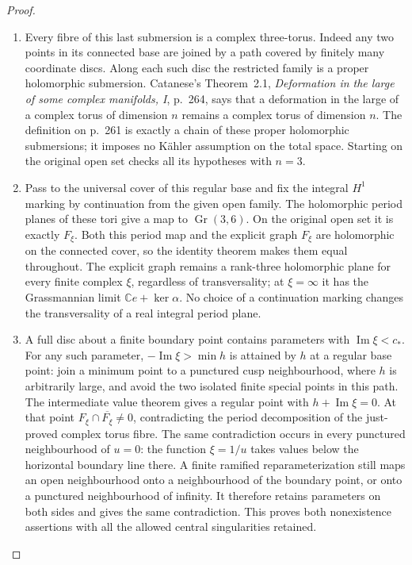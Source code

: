 \documentclass[11pt,a4paper]{article}
\theoremstyle{definition}
\begin{document}
\begin{proof}
\begin{enumerate}[label=\arabic*.]
\item Every fibre of this last submersion is a complex three-torus.
Indeed any two points in its connected base are joined by
a path covered by finitely many coordinate discs. Along
each such disc the restricted family is a proper holomorphic
submersion. Catanese's Theorem~2.1, \emph{Deformation in the
large of some complex manifolds, I}, p.~264, says that a
deformation in the large of a complex torus of dimension
$n$ remains a complex torus of dimension $n$. The definition
on p.~261 is exactly a chain of these proper holomorphic
submersions; it imposes no Kähler assumption on the total
space. Starting on the original open set checks all its
hypotheses with $n=3$.

\item Pass to the universal cover of this regular base and fix the
integral $H^1$ marking by continuation from the given open
family. The holomorphic period planes of these tori give
a map to $\operatorname{Gr}(3,6)$. On the original open
set it is exactly $F_\xi$. Both this period map and the
explicit graph $F_\xi$ are holomorphic on the connected
cover, so the identity theorem makes them equal throughout.
The explicit graph remains a rank-three holomorphic plane
for every finite complex $\xi$, regardless of transversality;
at $\xi=\infty$ it has the Grassmannian limit
$\mathbb C e+\ker\alpha$. No choice of a continuation
marking changes the transversality of a real integral
period plane.

\item A full disc about a finite boundary point contains parameters
with $\operatorname{Im}\xi<c_*$. For any such parameter,
$-\operatorname{Im}\xi>\min h$ is attained by $h$ at a
regular base point: join a minimum point to a punctured
cusp neighbourhood, where $h$ is arbitrarily large, and
avoid the two isolated finite special points in this path.
The intermediate value theorem gives a regular point with
$h+\operatorname{Im}\xi=0$. At that point
$F_\xi\cap\overline{F_\xi}\ne0$, contradicting the period
decomposition of the just-proved complex torus fibre.
The same contradiction occurs in every punctured
neighbourhood of $u=0$: the function $\xi=1/u$ takes
values below the horizontal boundary line there. A finite
ramified reparameterization still maps an open neighbourhood
onto a neighbourhood of the boundary point, or onto a
punctured neighbourhood of infinity. It therefore retains
parameters on both sides and gives the same contradiction.
This proves both nonexistence assertions with all the
allowed central singularities retained.

\end{enumerate}
\end{proof}
\end{document}
